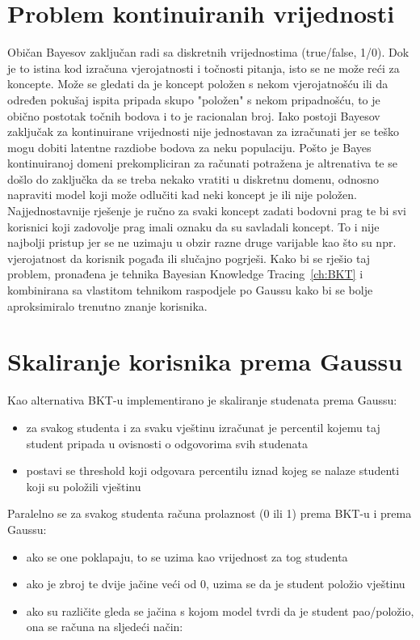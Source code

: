 \documentclass[times, utf8,projekt]{fer}
\begin{document}
	\section{Problem kontinuiranih vrijednosti}
		Običan Bayesov zaključan radi sa diskretnih vrijednostima (true/false, 1/0). Dok je to istina kod izračuna vjerojatnosti i točnosti pitanja, isto se ne može reći za koncepte. Može se gledati da je koncept položen s nekom vjerojatnošću ili da određen pokušaj ispita pripada skupo "položen" s nekom pripadnošću, to je obično postotak točnih bodova i to je racionalan broj. Iako postoji Bayesov zaključak za kontinuirane vrijednosti nije jednostavan za izračunati jer se teško mogu dobiti latentne razdiobe bodova za neku populaciju. Pošto je Bayes kontinuiranoj domeni prekompliciran za računati potražena je altrenativa te se došlo do zaključka da se treba nekako vratiti u diskretnu domenu, odnosno napraviti model koji može odlučiti kad neki koncept je ili nije položen.\newline
		Najjednostavnije rješenje je ručno za svaki koncept zadati bodovni prag te bi svi korisnici koji zadovolje prag imali oznaku da su savladali koncept. To i nije najbolji pristup jer se ne uzimaju u obzir razne druge varijable kao što su npr. vjerojatnost da korisnik pogađa ili slučajno pogrješi.\newline
		Kako bi se rješio taj problem, pronađena je tehnika Bayesian Knowledge Tracing~\ref{ch:BKT} i kombinirana sa vlastitom tehnikom raspodjele po Gaussu kako bi se bolje aproksimiralo trenutno znanje korisnika.
	\section{Skaliranje korisnika prema Gaussu}
		Kao alternativa BKT-u implementirano je skaliranje studenata prema Gaussu:
	\begin{itemize}
		\item za svakog studenta i za svaku vještinu izračunat je percentil kojemu taj student pripada u ovisnosti o odgovorima svih studenata
		\item postavi se threshold koji odgovara percentilu iznad kojeg se nalaze studenti koji su položili vještinu\newline
	\end{itemize}
		Paralelno se za svakog studenta računa prolaznost (0 ili 1) prema BKT-u i prema Gaussu:
	\begin{itemize}
		\item ako se one poklapaju, to se uzima kao vrijednost za tog studenta
		\item ako je zbroj te dvije jačine veći od 0, uzima se da je student položio vještinu
		\item ako su različite gleda se jačina s kojom model tvrdi da je student pao/položio, ona se računa na sljedeći način:%
	\end{itemize}
	
\end{document}
